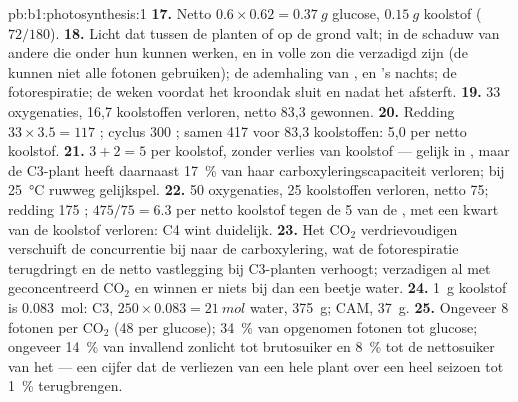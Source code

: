 \begin{solution}{pb:b1:photosynthesis:1}
\textbf{17.} Netto $0.6\times 0.62 = \qty{0.37}{g}$ glucose, $\qty{0.15}{g}$
koolstof ($72/180$).
\textbf{18.} Licht dat tussen de planten of op de grond valt;  in de
schaduw van andere  die onder hun kunnen werken, en  in volle zon
die verzadigd zijn (de  kunnen niet alle fotonen gebruiken); de ademhaling
van ,  en 's nachts; de fotorespiratie; de weken voordat het
kroondak sluit en nadat het afsterft.
\textbf{19.} 33 oxygenaties, 16,7 koolstoffen verloren, netto 83,3 gewonnen.
\textbf{20.} Redding $33\times 3.5 = 117$ ; cyclus 300 ; samen 417  voor
83,3 koolstoffen: 5,0  per netto koolstof.
\textbf{21.} $3 + 2 = 5$  per koolstof, zonder verlies van koolstof --- gelijk
in , maar de C3-plant heeft daarnaast \qty{17}{\%} van haar
carboxyleringscapaciteit verloren; bij \qty{25}{\celsius} ruwweg gelijkspel.
\textbf{22.} 50 oxygenaties, 25 koolstoffen verloren, netto 75; redding 175 ;
$475/75 = 6.3$  per netto koolstof tegen de 5 van de , met een kwart van
de koolstof verloren: C4 wint duidelijk.
\textbf{23.} Het $\mathrm{CO_2}$ verdrievoudigen verschuift de concurrentie bij
 naar de carboxylering, wat de fotorespiratie terugdringt en de netto
vastlegging bij C3-planten verhoogt;  verzadigen  al met
geconcentreerd $\mathrm{CO_2}$ en winnen er niets bij dan een beetje water.
\textbf{24.} \qty{1}{g} koolstof is \qty{0.083}{mol}: C3, $250\times 0.083 = \qty{21}{mol}$ water, \qty{375}{g}; CAM, \qty{37}{g}.
\textbf{25.} Ongeveer 8 fotonen per $\mathrm{CO_2}$ (48 per glucose);
\qty{34}{\%} van opgenomen fotonen tot glucose; ongeveer \qty{14}{\%} van invallend
zonlicht tot brutosuiker en \qty{8}{\%} tot de nettosuiker van het  --- een
cijfer dat de verliezen van een hele plant over een heel seizoen tot \qty{1}{\%}
terugbrengen.
\end{solution}
